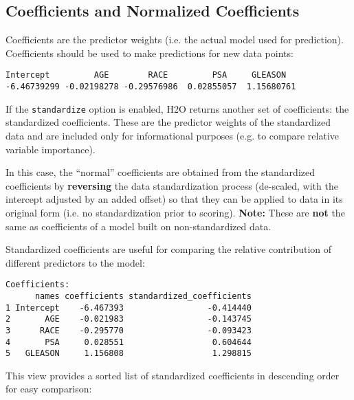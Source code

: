 \subsection{Coefficients and Normalized Coefficients}

Coefficients are the predictor weights (i.e. the actual model used for prediction).  Coefficients should be used to
make predictions for new data points:



\begin{lstlisting}[style=output]
  Intercept         AGE        RACE         PSA     GLEASON 
-6.46739299 -0.02198278 -0.29576986  0.02855057  1.15680761 
\end{lstlisting}

If the \texttt{standardize} option is enabled, H2O returns another set of coefficients: the standardized
coefficients. These are the predictor weights of the standardized data and are included only for informational
purposes (e.g. to compare relative variable importance). 

In this case, the ``normal'' coefficients are obtained
from the standardized coefficients by \textbf{reversing} the data standardization process (de-scaled, with the
intercept adjusted by an added offset) so that they can be applied to data in its original form (i.e. no
standardization prior to scoring). \textbf{Note:} These are \textbf{not} the same as coefficients of a model built
on non-standardized data.

Standardized coefficients are useful for comparing the relative contribution of different predictors to the
model:



\begin{lstlisting}[style=output]
Coefficients:
      names coefficients standardized_coefficients
1 Intercept    -6.467393                 -0.414440
2       AGE    -0.021983                 -0.143745
3      RACE    -0.295770                 -0.093423
4       PSA     0.028551                  0.604644
5   GLEASON     1.156808                  1.298815
\end{lstlisting}

This view provides a sorted list of standardized coefficients in descending order for easy comparison:

